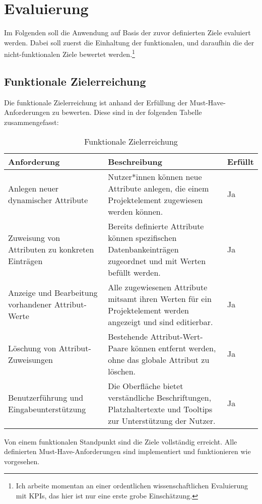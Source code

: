 \section{Evaluierung}
Im Folgenden soll die Anwendung auf Basis der zuvor definierten Ziele evaluiert werden. Dabei soll zuerst die Einhaltung der funktionalen,
und daraufhin die der nicht-funktionalen Ziele bewertet werden.\footnote{Ich arbeite momentan an einer ordentlichen wissenschaftlichen Evaluierung mit KPIs, das hier ist nur eine erste grobe Einschätzung.}
\subsection{Funktionale Zielerreichung}
Die funktionale Zielerreichung ist anhand der Erfüllung der Must-Have-Anforderungen zu bewerten. Diese sind in der folgenden Tabelle zusammengefasst:
\begin{table}[H]
    \centering
    \caption{Funktionale Zielerreichung}
    \label{tab:funktionaleZielerreichung}
    \begin{tabular}{|p{}|p{}|p{}|}
        \hline
        \textbf{Anforderung} & \textbf{Beschreibung} & \textbf{Erfüllt} \\ \hline
        Anlegen neuer dynamischer Attribute & Nutzer*innen können neue Attribute anlegen, die einem Projektelement zugewiesen werden können. & Ja \\ \hline
        Zuweisung von Attributen zu konkreten Einträgen & Bereits definierte Attribute können spezifischen Datenbankeinträgen zugeordnet und mit Werten befüllt werden. & Ja \\ \hline
        Anzeige und Bearbeitung vorhandener Attribut-Werte & Alle zugewiesenen Attribute mitsamt ihren Werten für ein Projektelement werden angezeigt und sind editierbar. & Ja \\ \hline
        Löschung von Attribut-Zuweisungen & Bestehende Attribut-Wert-Paare können entfernt werden, ohne das globale Attribut zu löschen. & Ja \\ \hline
        Benutzerführung und Eingabeunterstützung & Die Oberfläche bietet verständliche Beschriftungen, Platzhaltertexte und Tooltips zur Unterstützung der Nutzer. & Ja \\ \hline
    \end{tabular}
\end{table}
Von einem funktionalen Standpunkt sind die Ziele vollständig erreicht. Alle definierten Must-Have-Anforderungen sind implementiert und funktionieren wie vorgesehen.
